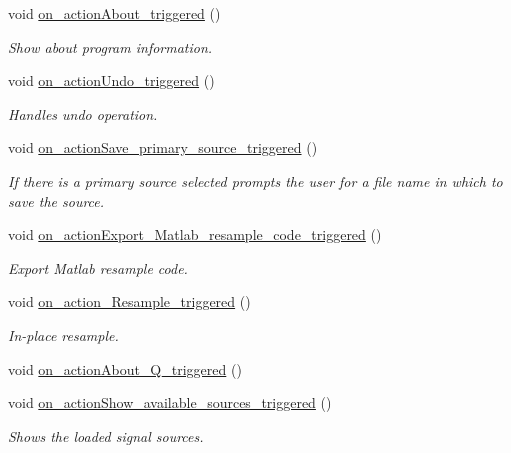 \begin{CompactItemize}
void \hyperlink{class_main_window_4f3ebda1ba39e0ef4d678b44893c9c7f}{on\_\-actionAbout\_\-triggered} ()
\begin{CompactList}\small\item\em Show about program information. \item\end{CompactList}\item 
void \hyperlink{class_main_window_bbab7cd8683132f28cf976d069c7c448}{on\_\-actionUndo\_\-triggered} ()
\begin{CompactList}\small\item\em Handles undo operation. \item\end{CompactList}\item 
void \hyperlink{class_main_window_79b36efc3f54a7c2950a7f51564eede4}{on\_\-actionSave\_\-primary\_\-source\_\-triggered} ()
\begin{CompactList}\small\item\em If there is a primary source selected prompts the user for a file name in which to save the source. \item\end{CompactList}\item 
void \hyperlink{class_main_window_5ea6092eaa0ddc6fea088e2287794b62}{on\_\-actionExport\_\-Matlab\_\-resample\_\-code\_\-triggered} ()
\begin{CompactList}\small\item\em Export Matlab resample code. \item\end{CompactList}\item 
void \hyperlink{class_main_window_872770dc71562e997c83623da7a22c95}{on\_\-action\_\-Resample\_\-triggered} ()
\begin{CompactList}\small\item\em In-place resample. \item\end{CompactList}\item 
void \hyperlink{class_main_window_56d8d0a8700b6018c690e7c2a6d324b3}{on\_\-actionAbout\_\-Q\_\-triggered} ()
\item 
void \hyperlink{class_main_window_9aed487b9cb20c001cee14ff1aeddf56}{on\_\-actionShow\_\-available\_\-sources\_\-triggered} ()
\begin{CompactList}\small\item\em Shows the loaded signal sources. \item\end{CompactList}\item 

\end{CompactItemize}
